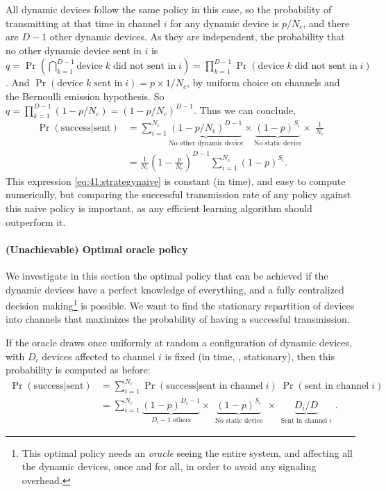 All dynamic devices follow the same policy in this case, so the probability of transmitting at that time in channel $i$ for any dynamic device is $p / N_c$, and there are $D-1$ other dynamic devices.
As they are independent, the probability that no other dynamic device sent in $i$
is $q = \Pr(\bigcap_{k=1}^{D-1} \text{device}\;k\;\text{did not sent in}\;i) = \prod_{k=1}^{D-1} \Pr(\text{device}\;k\;\text{did not sent in}\;i)$. And $\Pr(\text{device}\;k\;\text{sent in}\;i) = p \times 1 / N_c$, by uniform choice on channels and the Bernoulli emission hypothesis. So $q = \prod_{k=1}^{D-1} (1 - p/N_c) = (1-p/N_c)^{D-1}$. Thus we can conclude,
%
\begin{align}\label{eq:41:strategynaive}
    \Pr(\text{success}|\text{sent})
    & = \sum_{i=1}^{N_c} \underbrace{(1 - p / N_c)^{D-1}}_{\text{No other dynamic device}} \times \underbrace{(1-p)^{S_i}}_{\text{No static device}} \times\; \frac{1}{N_c} \nonumber \\
    & = \frac{1}{N_c} \left(1-\frac{p}{N_c}\right)^{D-1} \sum_{i=1}^{N_c} (1-p)^{S_i} .
\end{align}
This expression \eqref{eq:41:strategynaive} is constant (in time), and easy to compute numerically, but comparing the successful transmission rate of any policy against this naive policy is important, as any efficient learning algorithm should outperform it.


\paragraph{(Unachievable) Optimal oracle policy}

We investigate in this section the optimal policy that can be achieved if the dynamic devices have a perfect knowledge of everything, and a fully centralized decision making\footnote{This optimal policy needs an \emph{oracle} seeing the entire system, and affecting all the dynamic devices, once and for all, in order to avoid any signaling overhead.} is possible.
We want to find the stationary repartition of devices into channels that maximizes the probability of having a successful transmission.

If the oracle draws once uniformly at random a configuration of dynamic devices, with $D_i$ devices affected to channel $i$ is fixed (in time, \ie, stationary),
then this probability is computed as before:
\begin{align}\label{eq:41:prob_col}
    \Pr(\text{success}|\text{sent})
    & = \sum_{i=1}^{N_c} \Pr(\text{success}|\text{sent in channel}\;i) \; \Pr(\text{sent in channel}\;i) \nonumber \\
    & = \sum_{i=1}^{N_c} \underbrace{(1 - p)^{D_i - 1}}_{\;\;D_i - 1 \;\text{others}\;\;} \times \underbrace{(1 - p)^{S_i}}_{\;\;\text{No static device}\;\;} \times \underbrace{ D_i / D }_{\;\;\text{Sent in channel}\; i\;\;}.
\end{align}

